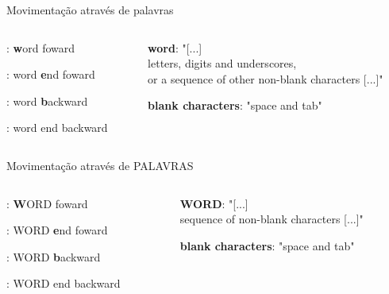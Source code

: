 \begin{frame}{Movimentação através de palavras}
    \begin{columns}
        \begin{column}{0.4\textwidth}
            \begin{widedescription}
                \item {}: \textbf{w}ord foward
                \item {}: word \textbf{e}nd foward
                \item {}: word \textbf{b}ackward
                \item {}: word end backward
            \end{widedescription}
        \end{column}
        
        \begin{column}{0.6\textwidth}
            \begin{widedescription}
                \item \textbf{word}: "[...] \\ letters, digits and underscores, \\
                or a sequence of other non-blank characters [...]"
                \item \textbf{blank characters}: "space and tab"
            \end{widedescription}
        \end{column}
    \end{columns}
\end{frame}

\begin{frame}{Movimentação através de PALAVRAS}
    \begin{columns}
        \begin{column}{0.4\textwidth}
            \begin{widedescription}
                \item {}: \textbf{W}ORD foward
                \item {}: WORD \textbf{e}nd foward
                \item {}: WORD \textbf{b}ackward
                \item {}: WORD end backward
            \end{widedescription}
        \end{column}
        
        \begin{column}{0.6\textwidth}
            \begin{widedescription}
                \item \textbf{WORD}: "[...] \\ sequence of non-blank characters [...]"
                \item \textbf{blank characters}: "space and tab"
            \end{widedescription}
        \end{column}
    \end{columns}
\end{frame}

